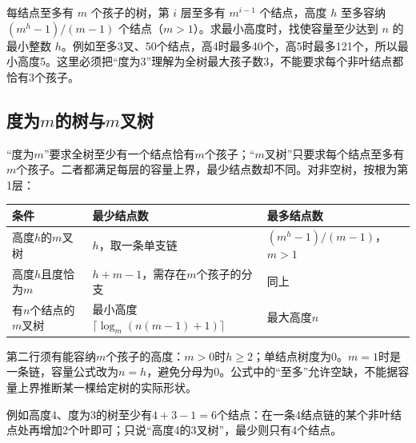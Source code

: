 每结点至多有 \(m\) 个孩子的树，第 \(i\) 层至多有 \(m^{i-1}\) 个结点，高度 \(h\) 至多容纳 \((m^h-1)/(m-1)\) 个结点（\(m>1\)）。求最小高度时，找使容量至少达到 \(n\) 的最小整数 \(h\)。例如至多3叉、50个结点，高4时最多40个，高5时最多121个，所以最小高度5。这里必须把``度为3''理解为全树最大孩子数3，不能要求每个非叶结点都恰有3个孩子。

\subsection{\texorpdfstring{度为\(m\)的树与\(m\)叉树}{度为m的树与m叉树}}\label{DS05-mary}

``度为\(m\)''要求全树至少有一个结点恰有\(m\)个孩子；``\(m\)叉树''只要求每个结点至多有\(m\)个孩子。二者都满足每层的容量上界，最少结点数却不同。对非空树，按根为第1层：

\par\medskip\noindent\begin{minipage}{\linewidth}\fontsize{9.3}{12}\selectfont\begin{tabularx}{\linewidth}{@{}YYY@{}}
\toprule\noalign{}
\begin{minipage}[b]{\linewidth}\raggedright
条件
\end{minipage} & \begin{minipage}[b]{\linewidth}\raggedright
最少结点数
\end{minipage} & \begin{minipage}[b]{\linewidth}\raggedright
最多结点数
\end{minipage} \\
\midrule\noalign{}


高度\(h\)的\(m\)叉树 & \(h\)，取一条单支链 & \((m^h-1)/(m-1)\)，\(m>1\) \\
高度\(h\)且度恰为\(m\) & \(h+m-1\)，需存在\(m\)个孩子的分支 & 同上 \\
有\(n\)个结点的\(m\)叉树 & 最小高度\(\lceil\log_m(n(m-1)+1)\rceil\) & 最大高度\(n\) \\
\bottomrule\end{tabularx}
\end{minipage}\par\medskip

第二行须有能容纳\(m\)个孩子的高度：\(m>0\)时\(h\ge2\)；单结点树度为0。\(m=1\)时是一条链，容量公式改为\(n=h\)，避免分母为0。公式中的``至多''允许空缺，不能据容量上界推断某一棵给定树的实际形状。

例如高度4、度为3的树至少有\(4+3-1=6\)个结点：在一条4结点链的某个非叶结点处再增加2个叶即可；只说``高度4的3叉树''，最少则只有4个结点。

